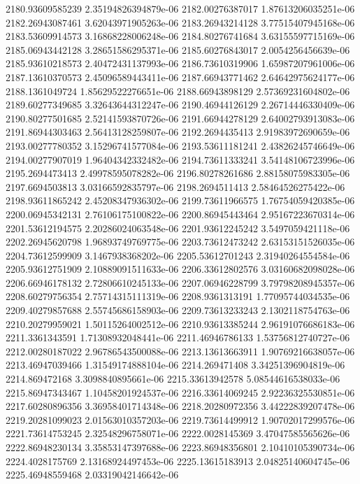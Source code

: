 {2180.93609585239 2.35194826394879e-06
2182.00276387017 1.87613206035251e-06
2182.26943087461 3.62043971905263e-06
2183.26943214128 3.77515407945168e-06
2183.53609914573 3.16868228006248e-06
2184.80276741684 3.63155597715169e-06
2185.06943442128 3.28651586295371e-06
2185.60276843017 2.0054256456639e-06
2185.93610218573 2.40472431137993e-06
2186.73610319906 1.65987207961006e-06
2187.13610370573 2.45096589443411e-06
2187.66943771462 2.64642975624177e-06
2188.1361049724 1.85629522276651e-06
2188.66943898129 2.57369231604802e-06
2189.60277349685 3.32643644312247e-06
2190.46944126129 2.26714446330409e-06
2190.80277501685 2.52141593870726e-06
2191.66944278129 2.64002793913083e-06
2191.86944303463 2.56413128259807e-06
2192.2694435413 2.91983972690659e-06
2193.00277780352 3.15296741577084e-06
2193.53611181241 2.43826245746649e-06
2194.00277907019 1.96404342332482e-06
2194.73611333241 3.54148106723996e-06
2195.2694473413 2.49978595078282e-06
2196.80278261686 2.88158075983305e-06
2197.6694503813 3.03166592835797e-06
2198.2694511413 2.58464526275422e-06
2198.93611865242 2.45208347936302e-06
2199.73611966575 1.76754059420385e-06
2200.06945342131 2.76106175100822e-06
2200.86945443464 2.95167223670314e-06
2201.53612194575 2.20286024063548e-06
2201.93612245242 3.5497059421118e-06
2202.26945620798 1.96893749769775e-06
2203.73612473242 2.63153151526035e-06
2204.73612599909 3.1467938368202e-06
2205.53612701243 2.31940264554584e-06
2205.93612751909 2.10889091511633e-06
2206.33612802576 3.03160682098028e-06
2206.66946178132 2.72806610245133e-06
2207.06946228799 3.79798208945357e-06
2208.60279756354 2.75714315111319e-06
2208.9361313191 1.77095744034535e-06
2209.40279857688 2.55745686158903e-06
2209.73613233243 2.1302118754763e-06
2210.20279959021 1.50115264002512e-06
2210.93613385244 2.96191076686183e-06
2211.3361343591 1.71308932048441e-06
2211.46946786133 1.53756812740727e-06
2212.00280187022 2.96786543500088e-06
2213.13613663911 1.90769216638057e-06
2213.46947039466 1.31549174888104e-06
2214.269471408 3.34251396904819e-06
2214.869472168 3.3098840895661e-06
2215.33613942578 5.08544616538033e-06
2215.86947343467 1.10458201924537e-06
2216.33614069245 2.92236325530851e-06
2217.60280896356 3.36958401714348e-06
2218.20280972356 3.44222839207478e-06
2219.20281099023 2.01563010357203e-06
2219.73614499912 1.90702017299576e-06
2221.73614753245 2.32548296758071e-06
2222.0028145369 3.47047585565626e-06
2222.86948230134 3.35853147397688e-06
2223.86948356801 2.10410105390734e-06
2224.4028175769 2.13168924497453e-06
2225.13615183913 2.04825140604745e-06
2225.46948559468 2.03319042146642e-06
}
